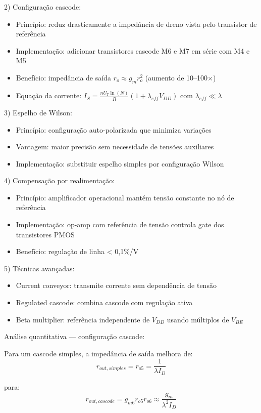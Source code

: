 ﻿\documentclass[12pt,a4paper]{article}
\begin{document}
2) Configuração cascode:
\begin{itemize}
    \item Princípio: reduz drasticamente a impedância de dreno vista pelo transistor de referência
    \item Implementação: adicionar transistores cascode M6 e M7 em série com M4 e M5
    \item Benefício: impedância de saída $r_o \approx g_m r_o^2$ (aumento de 10–100×)
    \item Equação da corrente: $I_S = \frac{nU_T \ln(N)}{R}(1 + \lambda_{eff} V_{DD})$ com $\lambda_{eff} \ll \lambda$
\end{itemize}

3) Espelho de Wilson:
\begin{itemize}
    \item Princípio: configuração auto-polarizada que minimiza variações
    \item Vantagem: maior precisão sem necessidade de tensões auxiliares
    \item Implementação: substituir espelho simples por configuração Wilson
\end{itemize}

4) Compensação por realimentação:
\begin{itemize}
    \item Princípio: amplificador operacional mantém tensão constante no nó de referência
    \item Implementação: op-amp com referência de tensão controla gate dos transistores PMOS
    \item Benefício: regulação de linha < 0,1\%/V
\end{itemize}

5) Técnicas avançadas:
\begin{itemize}
    \item Current conveyor: transmite corrente sem dependência de tensão
    \item Regulated cascode: combina cascode com regulação ativa
    \item Beta multiplier: referência independente de $V_{DD}$ usando múltiplos de $V_{BE}$
\end{itemize}

Análise quantitativa — configuração cascode:

Para um cascode simples, a impedância de saída melhora de:
$$r_{out,simples} = r_{o5} = \frac{1}{\lambda I_D} $$

para:
$$r_{out,cascode} = g_{m6} r_{o5} r_{o6} \approx \frac{g_m}{\lambda^2 I_D} $$
\end{document}
